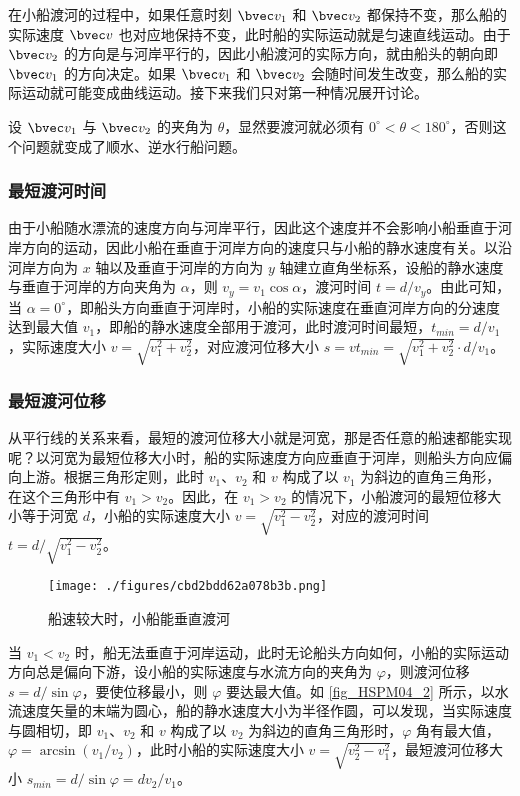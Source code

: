 在小船渡河的过程中，如果任意时刻 $\bvec v_1$ 和 $\bvec v_2$ 都保持不变，那么船的实际速度 $\bvec v$ 也对应地保持不变，此时船的实际运动就是匀速直线运动。由于 $\bvec v_2$ 的方向是与河岸平行的，因此小船渡河的实际方向，就由船头的朝向即 $\bvec v_1$ 的方向决定。如果 $\bvec v_1$ 和 $\bvec v_2$ 会随时间发生改变，那么船的实际运动就可能变成曲线运动。接下来我们只对第一种情况展开讨论。

设 $\bvec v_1$ 与 $\bvec v_2$ 的夹角为 $\theta$，显然要渡河就必须有 $0^\circ < \theta < 180^\circ $，否则这个问题就变成了顺水、逆水行船问题。

\subsubsection{最短渡河时间}

由于小船随水漂流的速度方向与河岸平行，因此这个速度并不会影响小船垂直于河岸方向的运动，因此小船在垂直于河岸方向的速度只与小船的静水速度有关。以沿河岸方向为 $x$ 轴以及垂直于河岸的方向为 $y$ 轴建立直角坐标系，设船的静水速度与垂直于河岸的方向夹角为 $\alpha$，则 $v_y = v_1 \cos \alpha$，渡河时间 $t=d/v_y$。由此可知，当 $\alpha = 0^\circ$，即船头方向垂直于河岸时，小船的实际速度在垂直河岸方向的分速度达到最大值 $v_1$，即船的静水速度全部用于渡河，此时渡河时间最短，$t_{min}=d/v_1$，实际速度大小 $v=\sqrt{v_1^2+v_2^2}$，对应渡河位移大小 $s=vt_{min}=\sqrt{v_1^2+v_2^2}\cdot d/v_1$。

\subsubsection{最短渡河位移}

从平行线的关系来看，最短的渡河位移大小就是河宽，那是否任意的船速都能实现呢？以河宽为最短位移大小时，船的实际速度方向应垂直于河岸，则船头方向应偏向上游。根据三角形定则，此时 $v_1$、$v_2$ 和 $v$ 构成了以 $v_1$ 为斜边的直角三角形，在这个三角形中有 $v_1>v_2$。因此，在 $v_1>v_2$ 的情况下，小船渡河的最短位移大小等于河宽 $d$，小船的实际速度大小 $v=\sqrt{v_1^2-v_2^2}$，对应的渡河时间 $t=d/\sqrt{v_1^2-v_2^2}$。

\begin{figure}[ht]
\centering
\texttt{[image: ./figures/cbd2bdd62a078b3b.png]}
\caption{船速较大时，小船能垂直渡河} \label{fig_HSPM04_1}
\end{figure}

当 $v_1<v_2$ 时，船无法垂直于河岸运动，此时无论船头方向如何，小船的实际运动方向总是偏向下游，设小船的实际速度与水流方向的夹角为 $\varphi$，则渡河位移 $s = d/\sin \varphi$，要使位移最小，则 $\varphi$ 要达最大值。如 \autoref{fig_HSPM04_2} 所示，以水流速度矢量的末端为圆心，船的静水速度大小为半径作圆，可以发现，当实际速度与圆相切，即 $v_1$、$v_2$ 和 $v$ 构成了以 $v_2$ 为斜边的直角三角形时，$\varphi$ 角有最大值，$\varphi=\arcsin(v_1/v_2)$，此时小船的实际速度大小 $v=\sqrt{v_2^2-v_1^2}$，最短渡河位移大小 $s_{min} = d/\sin \varphi=dv_2/v_1$。

